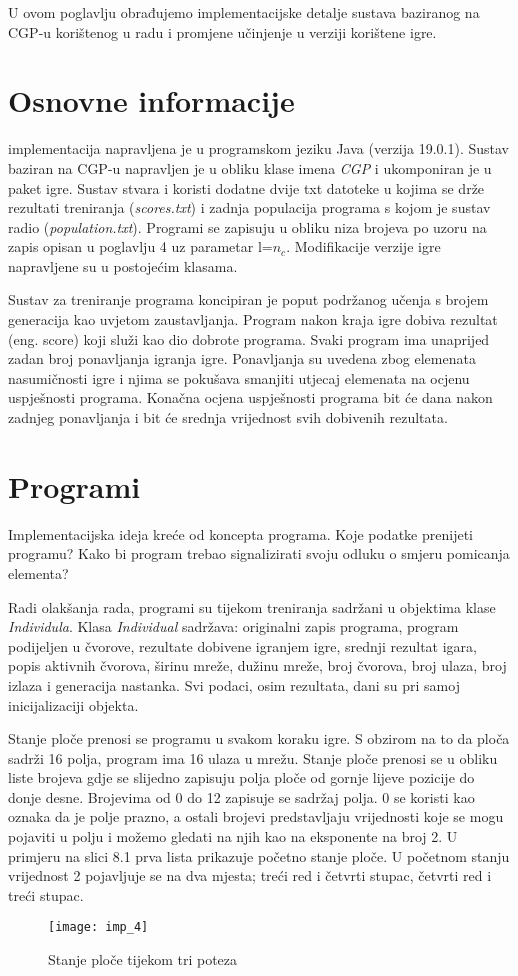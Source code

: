 \quad U ovom poglavlju obrađujemo implementacijske detalje sustava baziranog na CGP-u korištenog u radu i promjene učinjenje u verziji korištene igre.
\section{Osnovne informacije}
 implementacija napravljena je u programskom jeziku Java (verzija 19.0.1). Sustav baziran na CGP-u napravljen je u obliku klase imena \textit{CGP} i ukomponiran je u paket igre. Sustav stvara i koristi dodatne dvije txt datoteke u kojima se drže rezultati treniranja (\textit{scores.txt}) i zadnja populacija programa s kojom je sustav radio (\textit{population.txt}). Programi se zapisuju u obliku niza brojeva po uzoru na zapis opisan u poglavlju 4 uz parametar l=$ n_{c} $. Modifikacije verzije igre napravljene su u postojećim klasama.
\par 
Sustav za treniranje programa koncipiran je poput podržanog učenja s brojem generacija kao uvjetom zaustavljanja. Program nakon kraja igre dobiva rezultat (eng. score) koji služi kao dio dobrote programa. Svaki program ima unaprijed zadan broj ponavljanja igranja igre. Ponavljanja su uvedena zbog elemenata nasumičnosti igre i njima se pokušava smanjiti utjecaj elemenata na ocjenu uspješnosti programa. Konačna ocjena uspješnosti programa bit će dana nakon zadnjeg ponavljanja i bit će srednja vrijednost svih dobivenih rezultata.
\par
\section{Programi}
\quad Implementacijska ideja kreće od koncepta programa. Koje podatke prenijeti programu? Kako bi program trebao signalizirati svoju odluku o smjeru pomicanja elementa?
\par
Radi olakšanja rada, programi su tijekom treniranja sadržani u objektima klase \textit{Individula}. Klasa \textit{Individual} sadržava: originalni zapis programa, program podijeljen u čvorove, rezultate dobivene igranjem igre, srednji rezultat igara, popis aktivnih čvorova, širinu mreže, dužinu mreže, broj čvorova, broj ulaza, broj izlaza i generacija nastanka. Svi podaci, osim rezultata, dani su pri samoj inicijalizaciji objekta.
\par 
Stanje ploče prenosi se programu u svakom koraku igre. S obzirom na to da ploča sadrži 16 polja, program ima 16 ulaza u mrežu. Stanje ploče prenosi se u obliku liste brojeva gdje se slijedno zapisuju polja ploče od gornje lijeve pozicije do donje desne. Brojevima od 0 do 12 zapisuje se sadržaj polja. 0 se koristi kao oznaka da je polje prazno, a ostali brojevi predstavljaju vrijednosti koje se mogu pojaviti u polju i možemo gledati na njih kao na eksponente na broj 2. U primjeru na slici 8.1 prva lista prikazuje početno stanje ploče. U početnom stanju vrijednost 2 pojavljuje se na dva mjesta; treći red i četvrti stupac, četvrti red i treći stupac.
 \begin{figure}[h]
	\centering
	\texttt{[image: imp\_4]}
	\caption{Stanje ploče tijekom tri poteza}
\end{figure}

